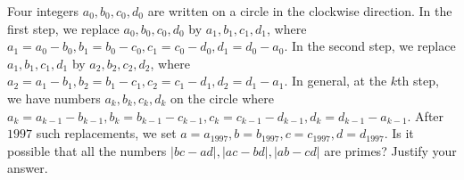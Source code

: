 Four integers $a_0,b_0,c_0,d_0$ are written on a circle in the clockwise direction. In the first step, we replace $a_0,b_0,c_0,d_0$ by $a_1,b_1,c_1,d_1$, where $a_1=a_0-b_0,b_1=b_0-c_0,c_1=c_0-d_0,d_1=d_0-a_0$. In the second step, we replace $a_1,b_1,c_1,d_1$ by $a_2,b_2,c_2,d_2$, where $a_2=a_1-b_1,b_2=b_1-c_1,c_2=c_1-d_1,d_2=d_1-a_1$. In general, at the $k$th step, we have numbers $a_k,b_k,c_k,d_k$ on the circle where $a_k=a_{k-1}-b_{k-1},b_k=b_{k-1}-c_{k-1},c_k=c_{k-1}-d_{k-1},d_k=d_{k-1}-a_{k-1}$. After $1997$ such replacements, we set $a=a_{1997},b=b_{1997},c=c_{1997},d=d_{1997}$. Is it possible that all the numbers $|bc-ad|,|ac-bd|,|ab-cd|$ are primes? Justify your answer.
